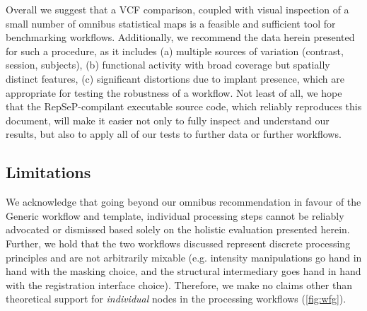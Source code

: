 Overall we suggest that a VCF comparison, coupled with visual inspection of a small number of omnibus statistical maps is a feasible and sufficient tool for benchmarking workflows.
Additionally, we recommend the data herein presented for such a procedure, as it includes (a) multiple sources of variation (contrast, session, subjects), (b) functional activity with broad coverage but spatially distinct features, (c) significant distortions due to implant presence, which are appropriate for testing the robustness of a workflow.
Not least of all, we hope that the RepSeP-compilant executable source code, which reliably reproduces this document, will make it easier not only to fully inspect and understand our results, but also to apply all of our tests to further data or further workflows.

\subsection{Limitations}

We acknowledge that going beyond our omnibus recommendation in favour of the Generic workflow and template, individual processing steps cannot be reliably advocated or dismissed based solely on the holistic evaluation presented herein.
Further, we hold that the two workflows discussed represent discrete processing principles and are not arbitrarily mixable (e.g. intensity manipulations go hand in hand with the masking choice, and the structural intermediary goes hand in hand with the registration interface choice).
Therefore, we make no claims other than theoretical support for \textit{individual} nodes in the processing workflows (\cref{fig:wfg}).

